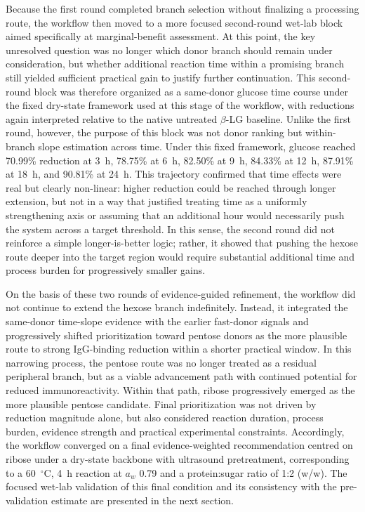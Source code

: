 Because the first round completed branch selection without finalizing a processing route, the workflow then moved to a more focused second-round wet-lab block aimed specifically at marginal-benefit assessment. At this point, the key unresolved question was no longer which donor branch should remain under consideration, but whether additional reaction time within a promising branch still yielded sufficient practical gain to justify further continuation. This second-round block was therefore organized as a same-donor glucose time course under the fixed dry-state framework used at this stage of the workflow, with reductions again interpreted relative to the native untreated $\beta$-LG baseline. Unlike the first round, however, the purpose of this block was not donor ranking but within-branch slope estimation across time. Under this fixed framework, glucose reached 70.99\% reduction at 3~h, 78.75\% at 6~h, 82.50\% at 9~h, 84.33\% at 12~h, 87.91\% at 18~h, and 90.81\% at 24~h. This trajectory confirmed that time effects were real but clearly non-linear: higher reduction could be reached through longer extension, but not in a way that justified treating time as a uniformly strengthening axis or assuming that an additional hour would necessarily push the system across a target threshold. In this sense, the second round did not reinforce a simple longer-is-better logic; rather, it showed that pushing the hexose route deeper into the target region would require substantial additional time and process burden for progressively smaller gains.

On the basis of these two rounds of evidence-guided refinement, the workflow did not continue to extend the hexose branch indefinitely. Instead, it integrated the same-donor time-slope evidence with the earlier fast-donor signals and progressively shifted prioritization toward pentose donors as the more plausible route to strong IgG-binding reduction within a shorter practical window. In this narrowing process, the pentose route was no longer treated as a residual peripheral branch, but as a viable advancement path with continued potential for reduced immunoreactivity. Within that path, ribose progressively emerged as the more plausible pentose candidate. Final prioritization was not driven by reduction magnitude alone, but also considered reaction duration, process burden, evidence strength and practical experimental constraints. Accordingly, the workflow converged on a final evidence-weighted recommendation centred on ribose under a dry-state backbone with ultrasound pretreatment, corresponding to a 60~$^\circ$C, 4~h reaction at $a_w$ 0.79 and a protein:sugar ratio of 1:2 (w/w). The focused wet-lab validation of this final condition and its consistency with the pre-validation estimate are presented in the next section.


